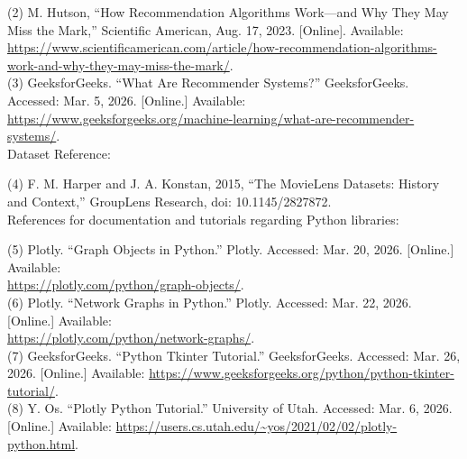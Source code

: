 \documentclass[fontsize=11pt]{article}
\begin{document}
(2) M. Hutson, “How Recommendation Algorithms Work—and Why They May Miss the Mark,” Scientific American, Aug. 17, 2023. [Online]. Available: \\ \url{https://www.scientificamerican.com/article/how-recommendation-algorithms-work-and-why-they-may-miss-the-mark/}.\\

(3) GeeksforGeeks. “What Are Recommender Systems?” GeeksforGeeks. Accessed: Mar. 5, 2026. [Online.] Available: \url{https://www.geeksforgeeks.org/machine-learning/what-are-recommender-systems/}.\\

\color{blue}
Dataset Reference: \\

\color{black}

(4) F. M. Harper and J. A. Konstan, 2015, “The MovieLens Datasets: History and Context,” GroupLens Research, doi: 10.1145/2827872. \\

\color{blue}
References for documentation and tutorials regarding Python libraries: \\

\color{black}

(5) Plotly. “Graph Objects in Python.” Plotly. Accessed: Mar. 20, 2026. [Online.] Available: \\ \url{https://plotly.com/python/graph-objects/}. \\

(6) Plotly. “Network Graphs in Python.” Plotly. Accessed: Mar. 22, 2026. [Online.] Available:\\ \url{https://plotly.com/python/network-graphs/}. \\

(7) GeeksforGeeks. “Python Tkinter Tutorial.” GeeksforGeeks. Accessed: Mar. 26, 2026. [Online.] Available: \url{https://www.geeksforgeeks.org/python/python-tkinter-tutorial/}. \\

(8) Y. Os. “Plotly Python Tutorial.” University of Utah. Accessed: Mar. 6, 2026. [Online.] Available: \url{https://users.cs.utah.edu/~yos/2021/02/02/plotly-python.html}.\\
\end{document}
